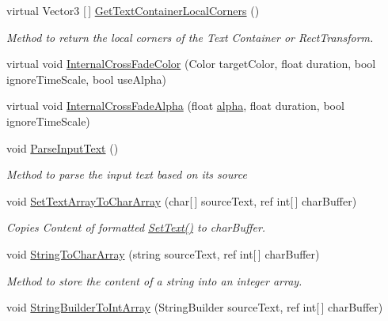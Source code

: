 \begin{DoxyCompactItemize}
virtual Vector3 \mbox{[}$\,$\mbox{]} \mbox{\hyperlink{class_t_m_pro_1_1_t_m_p___text_aad195b1745c7631eaed1376b554a64b9}{Get\+Text\+Container\+Local\+Corners}} ()
\begin{DoxyCompactList}\small\item\em Method to return the local corners of the Text Container or Rect\+Transform. \end{DoxyCompactList}\item 
virtual void \mbox{\hyperlink{class_t_m_pro_1_1_t_m_p___text_a22998506360d8760ae4e7df770e0f3fb}{Internal\+Cross\+Fade\+Color}} (Color target\+Color, float duration, bool ignore\+Time\+Scale, bool use\+Alpha)
\item 
virtual void \mbox{\hyperlink{class_t_m_pro_1_1_t_m_p___text_af04bfde9fe669030330b18e59d3743cd}{Internal\+Cross\+Fade\+Alpha}} (float \mbox{\hyperlink{class_t_m_pro_1_1_t_m_p___text_aca56e662ce122bb749faa1b044f29a57}{alpha}}, float duration, bool ignore\+Time\+Scale)
\item 
void \mbox{\hyperlink{class_t_m_pro_1_1_t_m_p___text_abf101b7be511178e9d0d6999dcd26977}{Parse\+Input\+Text}} ()
\begin{DoxyCompactList}\small\item\em Method to parse the input text based on its source \end{DoxyCompactList}\item 
void \mbox{\hyperlink{class_t_m_pro_1_1_t_m_p___text_a6405a9fd3c1d9ec929b50a6e070673ad}{Set\+Text\+Array\+To\+Char\+Array}} (char\mbox{[}$\,$\mbox{]} source\+Text, ref int\mbox{[}$\,$\mbox{]} char\+Buffer)
\begin{DoxyCompactList}\small\item\em Copies Content of formatted \mbox{\hyperlink{class_t_m_pro_1_1_t_m_p___text_a8aebc83540d494fd574a92470762fdaa}{Set\+Text()}} to char\+Buffer. \end{DoxyCompactList}\item 
void \mbox{\hyperlink{class_t_m_pro_1_1_t_m_p___text_added9ace8138f71b06a8a4df70ac8c6a}{String\+To\+Char\+Array}} (string source\+Text, ref int\mbox{[}$\,$\mbox{]} char\+Buffer)
\begin{DoxyCompactList}\small\item\em Method to store the content of a string into an integer array. \end{DoxyCompactList}\item 
void \mbox{\hyperlink{class_t_m_pro_1_1_t_m_p___text_a8924da6e6d1cecb3b8c542d3ad9d92cd}{String\+Builder\+To\+Int\+Array}} (String\+Builder source\+Text, ref int\mbox{[}$\,$\mbox{]} char\+Buffer)

\end{DoxyCompactItemize}
